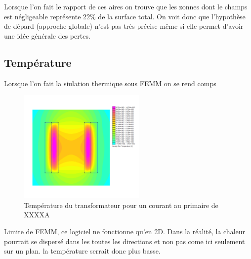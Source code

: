 Lorsque l'on fait le rapport de ces aires on trouve que les zonnes dont le champs est négligeable représente 22\% de la surface total. On voit donc que l'hypothèse de dépard (approche globale) n'est pas très précise même si elle permet d'avoir une idée générale des pertes.


\subsection{Température}

Lorsque l'on fait la siulation thermique sous FEMM on se rend comps 
\begin{figure}[ht]
	\begin{center}
	\includegraphics[width=0.55\textwidth]{images/TP3_thermo}
	\caption{Température du transformateur pour un courant au primaire de XXXXA}\label{img:TransfoThermo}
	\end{center}
\end{figure}

Limite de FEMM, ce logiciel ne fonctionne qu'en 2D. Dans la réalité, la chaleur pourrait se dispersé dans les toutes les directions et non pas come ici seulement sur un plan. la température serrait donc plus basse. 
